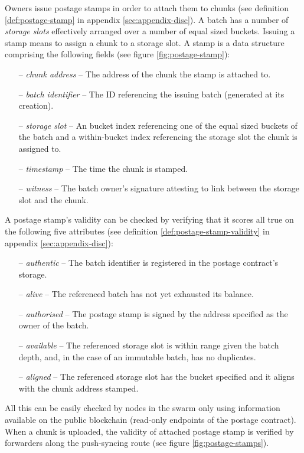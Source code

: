 Owners issue postage stamps in order to attach them to chunks (see definition \ref{def:postage-stamp} in appendix \ref{sec:appendix-disc}). A batch has a number of \emph{storage slots} effectively arranged over a number of equal sized buckets. Issuing a stamp means to assign a chunk to a storage slot. A stamp is a data structure comprising the following fields (see figure  \ref{fig:postage-stamp}):

\begin{itemize}[noitemsep]
    \item[--] \emph{chunk address} -- The address of the chunk the stamp is attached to. 
    \item[--] \emph{batch identifier} --  The ID referencing the issuing batch (generated at its creation).
    \item[--] \emph{storage slot} -- An bucket index referencing one of the equal sized buckets of the batch and a within-bucket index referencing the storage slot the chunk is assigned to.
    \item[--] \emph{timestamp} -- The time the chunk is stamped. 
    \item[--] \emph{witness} -- The batch owner's signature attesting to link between the storage slot and the chunk.
\end{itemize}

A postage stamp's validity can be checked by verifying that it scores all true on the following five attributes (see definition \ref{def:postage-stamp-validity} in appendix \ref{sec:appendix-disc}):

\begin{itemize}[noitemsep]
\item[--] \emph{authentic} -- The batch identifier is registered in the postage contract's storage.
\item[--] \emph{alive} -- The referenced batch has not yet exhausted its balance.
\item[--] \emph{authorised} -- The postage stamp is signed by the address specified as the owner of the batch. 
\item[--] \emph{available} -- The referenced storage slot is within range given the batch depth, and, in the case of an immutable batch, has no duplicates.
\item[--] \emph{aligned} -- The referenced storage slot has the bucket specified and it aligns with the chunk address stamped.
\end{itemize}

All this can be easily checked by nodes in the swarm only using information available on the public blockchain (read-only endpoints of the postage contract). When a chunk is uploaded, the validity of attached postage stamp is verified by forwarders along the push-syncing route  (see figure \ref{fig:postage-stamps}).


